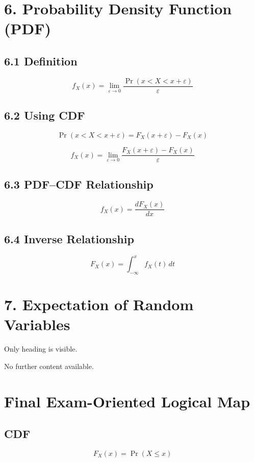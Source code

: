 \documentclass[12pt]{article}
\begin{document}
\section*{6. Probability Density Function (PDF)}

\subsection*{6.1 Definition}

\[
f_X(x)=\lim_{\varepsilon\to 0}
\frac{\Pr(x<X<x+\varepsilon)}{\varepsilon}
\]

\subsection*{6.2 Using CDF}

\[
\Pr(x<X<x+\varepsilon)=F_X(x+\varepsilon)-F_X(x)
\]

\[
f_X(x)=\lim_{\varepsilon\to 0}
\frac{F_X(x+\varepsilon)-F_X(x)}{\varepsilon}
\]

\subsection*{6.3 PDF--CDF Relationship}

\[
f_X(x)=\frac{dF_X(x)}{dx}
\]

\subsection*{6.4 Inverse Relationship}

\[
F_X(x)=\int_{-\infty}^{x} f_X(t)\,dt
\]

\section*{7. Expectation of Random Variables}

Only heading is visible.

No further content available.

\section*{Final Exam-Oriented Logical Map}

\subsection*{CDF}

\[
F_X(x)=\Pr(X\le x)
\]
\end{document}
